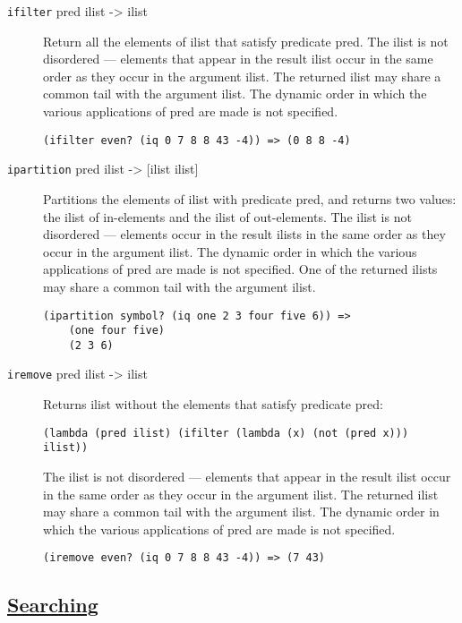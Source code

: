 \begin{description}
\item[ \href{}{} \texttt{ifilter} pred ilist -\textgreater{} ilist ]
Return all the elements of ilist that satisfy predicate pred. The ilist
is not disordered --- elements that appear in the result ilist occur in
the same order as they occur in the argument ilist. The returned ilist
may share a common tail with the argument ilist. The dynamic order in
which the various applications of pred are made is not specified.

\begin{verbatim}
(ifilter even? (iq 0 7 8 8 43 -4)) => (0 8 8 -4)
\end{verbatim}
\item[ \href{}{} \texttt{ipartition} pred ilist -\textgreater{} {[}ilist
ilist{]} ]
Partitions the elements of ilist with predicate pred, and returns two
values: the ilist of in-elements and the ilist of out-elements. The
ilist is not disordered --- elements occur in the result ilists in the
same order as they occur in the argument ilist. The dynamic order in
which the various applications of pred are made is not specified. One of
the returned ilists may share a common tail with the argument ilist.

\begin{verbatim}
(ipartition symbol? (iq one 2 3 four five 6)) => 
    (one four five)
    (2 3 6)
\end{verbatim}
\item[ \href{}{} \texttt{iremove} pred ilist -\textgreater{} ilist ]
Returns ilist without the elements that satisfy predicate pred:

\begin{verbatim}
(lambda (pred ilist) (ifilter (lambda (x) (not (pred x))) ilist))
\end{verbatim}

The ilist is not disordered --- elements that appear in the result ilist
occur in the same order as they occur in the argument ilist. The
returned ilist may share a common tail with the argument ilist. The
dynamic order in which the various applications of pred are made is not
specified.

\begin{verbatim}
(iremove even? (iq 0 7 8 8 43 -4)) => (7 43)
\end{verbatim}
\end{description}

\subsection{\texorpdfstring{\href{}{Searching}}{Searching}}\label{searching}

